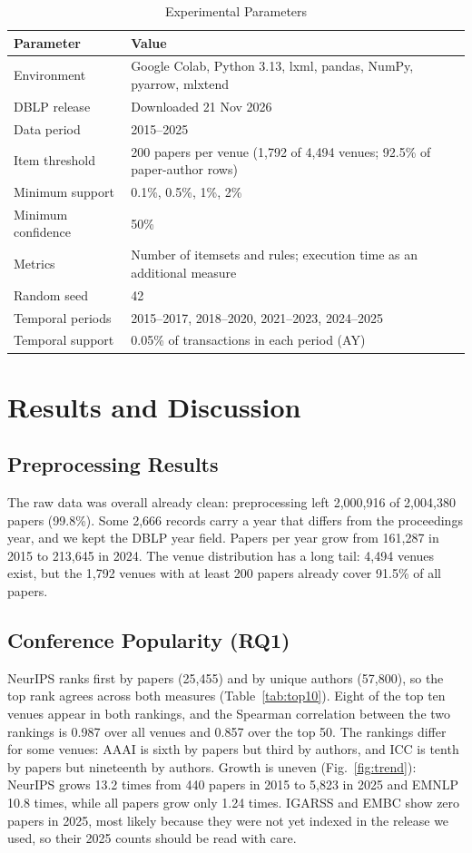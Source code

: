 \documentclass[conference]{IEEEtran}
\begin{document}
\begin{table}[t]
\caption{Experimental Parameters}
\label{tab:params}
\centering
\footnotesize
\begin{tabular}{p{2.4cm}p{5.0cm}}
\toprule
Parameter & Value \\
\midrule
Environment & Google Colab, Python 3.13, lxml, pandas, NumPy, pyarrow, mlxtend \\
DBLP release & Downloaded 21 Nov 2026 \\
Data period & 2015--2025 \\
Item threshold & 200 papers per venue (1,792 of 4,494 venues; 92.5\% of paper-author rows) \\
Minimum support & 0.1\%, 0.5\%, 1\%, 2\% \\
Minimum confidence & 50\% \\
Metrics & Number of itemsets and rules; execution time as an additional measure \\
Random seed & 42 \\
Temporal periods & 2015--2017, 2018--2020, 2021--2023, 2024--2025 \\
Temporal support & 0.05\% of transactions in each period (AY) \\
\bottomrule
\end{tabular}
\end{table}

\section{Results and Discussion}
\subsection{Preprocessing Results}
The raw data was overall already clean: preprocessing left 2,000,916 of 2,004,380 papers (99.8\%). Some 2,666 records carry a year that differs from the proceedings year, and we kept the DBLP year field. Papers per year grow from 161,287 in 2015 to 213,645 in 2024. The venue distribution has a long tail: 4,494 venues exist, but the 1,792 venues with at least 200 papers already cover 91.5\% of all papers.

\subsection{Conference Popularity (RQ1)}
NeurIPS ranks first by papers (25,455) and by unique authors (57,800), so the top rank agrees across both measures (Table~\ref{tab:top10}). Eight of the top ten venues appear in both rankings, and the Spearman correlation between the two rankings is 0.987 over all venues and 0.857 over the top 50. The rankings differ for some venues: AAAI is sixth by papers but third by authors, and ICC is tenth by papers but nineteenth by authors. Growth is uneven (Fig.~\ref{fig:trend}): NeurIPS grows 13.2 times from 440 papers in 2015 to 5,823 in 2025 and EMNLP 10.8 times, while all papers grow only 1.24 times. IGARSS and EMBC show zero papers in 2025, most likely because they were not yet indexed in the release we used, so their 2025 counts should be read with care.
\end{document}
